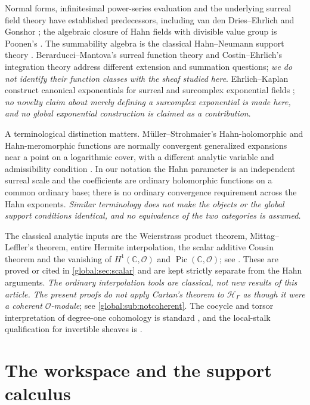 \documentclass[11pt,letterpaper]{article}
\theoremstyle{definition}
\theoremstyle{remark}
\newcommand{\C}{\mathbb C}
\newcommand{\OO}{\mathcal O}
\newcommand{\HH}{\mathscr H_\Gamma}
\newcommand{\Pic}{\operatorname{Pic}}
\numberwithin{equation}{section}
\begin{document}
Normal forms, infinitesimal power-series evaluation and the underlying surreal field theory have established predecessors, including van den Dries--Ehrlich \cite{vdDE} and Gonshor \cite{Gonshor}; the algebraic closure of Hahn fields with divisible value group is Poonen's \cite[Corollary~4]{Poonen}. The summability algebra is the classical Hahn--Neumann support theory \cite{Neumann}. Berarducci--Mantova's surreal function theory \cite{BM} and Costin--Ehrlich's integration theory \cite{CE} address different extension and summation questions; \emph{we do not identify their function classes with the sheaf studied here}. Ehrlich--Kaplan construct canonical exponentials for surreal and surcomplex exponential fields \cite{EK}; \emph{no novelty claim about merely defining a surcomplex exponential is made here, and no global exponential construction is claimed as a contribution}.

A terminological distinction matters. M\"uller--Strohmaier's Hahn-holomorphic and Hahn-meromorphic functions are normally convergent generalized expansions near a point on a logarithmic cover, with a different analytic variable and admissibility condition \cite[Definitions~2.3 and~2.5]{MS}. In our notation the Hahn parameter is an independent surreal scale and the coefficients are ordinary holomorphic functions on a common ordinary base; there is no ordinary convergence requirement across the Hahn exponents. \emph{Similar terminology does not make the objects or the global support conditions identical, and no equivalence of the two categories is assumed.}

The classical analytic inputs are the Weierstrass product theorem, Mittag--Leffler's theorem, entire Hermite interpolation, the scalar additive Cousin theorem and the vanishing of $H^1(\C,\OO)$ and $\Pic(\C,\OO)$; see \cite{Ahlfors,McMullen,Demailly}. These are proved or cited in \cref{global:sec:scalar} and are kept strictly separate from the Hahn arguments. \emph{The ordinary interpolation tools are classical, not new results of this article. The present proofs do not apply Cartan's theorem to $\HH$ as though it were a coherent $\OO$-module}; see \cref{global:sub:notcoherent}. The cocycle and torsor interpretation of degree-one cohomology is standard \cite[Tag~02FQ]{Stacks}, and the local-stalk qualification for invertible sheaves is \cite[Tag~09NT]{Stacks}.

\section{The workspace and the support calculus}\label{global:sec:workspace}
\end{document}
